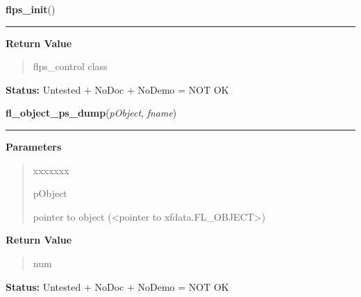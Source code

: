     \vspace{0.5ex}

\hspace{.8\funcindent}\begin{boxedminipage}{\funcwidth}

    \raggedright \textbf{flps\_init}()

    \vspace{-1.5ex}

    \rule{\textwidth}{0.5\fboxrule}
\setlength{\parskip}{2ex}
\setlength{\parskip}{1ex}
      \textbf{Return Value}
    \vspace{-1ex}

      \begin{quote}
      flps\_control class

      \end{quote}

\textbf{Status:} Untested + NoDoc + NoDemo = NOT OK



    \end{boxedminipage}

    \label{xformslib:library:fl_object_ps_dump}

    \vspace{0.5ex}

\hspace{.8\funcindent}\begin{boxedminipage}{\funcwidth}

    \raggedright \textbf{fl\_object\_ps\_dump}(\textit{pObject}, \textit{fname})

    \vspace{-1.5ex}

    \rule{\textwidth}{0.5\fboxrule}
\setlength{\parskip}{2ex}
\setlength{\parskip}{1ex}
      \textbf{Parameters}
      \vspace{-1ex}

      \begin{quote}
        \begin{Ventry}{xxxxxxx}

          \item[pObject]

          pointer to object ({\textless}pointer to 
          xfdata.FL\_OBJECT{\textgreater})

        \end{Ventry}

      \end{quote}

      \textbf{Return Value}
    \vspace{-1ex}

      \begin{quote}
      num

      \end{quote}

\textbf{Status:} Untested + NoDoc + NoDemo = NOT OK



    \end{boxedminipage}


